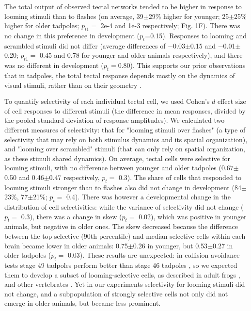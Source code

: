 \documentclass{article}
\begin{document}
The total output of observed tectal networks tended to be higher in response to looming stimuli than to flashes (on average, 39$\pm$29\% higher for younger; 25$\pm$25\% higher for older tadpoles; $p_{t1}=$ 2e-4 and 1e-3 respectively; Fig. 1F). There was no change in this preference in development ($p_t$=0.15). Responses to looming and scrambled stimuli did not differ (average differences of $-$0.03$\pm$0.15 and $-$0.01$\pm$0.20; $p_{t1}=$ 0.45 and 0.78 for younger and older animals respectively), and there was no different in development ($p_t=$0.80). This supports our prior observations that in tadpoles, the total tectal response depends mostly on the dynamics of visual stimuli, rather than on their geometry \citep{khakhalin2014,jang2016}.

To quantify selectivity of each individual tectal cell, we used Cohen’s $d$ effect size of cell  responses to different stimuli (the difference in mean responses, divided by the pooled standard deviation of response amplitudes). We calculated two different measures of selectivity: that for "looming stimuli over flashes" (a type of selectivity that may rely on both stimulus dynamics and its spatial organization), and "looming over scrambled" stimuli (that can only rely on spatial organization, as these stimuli shared dynamics). On average, tectal cells were selective for looming stimuli, with no difference between younger and older tadpoles (0.67$\pm$0.50 and 0.46$\pm$0.47 respectively, $p_t=$ 0.3). The share of cells that responded to looming stimuli stronger than to flashes also did not change in development (84$\pm$23\%, 77$\pm$21\%; $p_t=$ 0.4). There was however a developmental change in the distribution of cell selectivities: while the variance of selectivity did not change ($p_t=$ 0.3), there was a change in skew ($p_t=$ 0.02), which was positive in younger animals, but negative in older ones. The skew decreased because the difference between the top-selective (90th percentile) and median selective cells within each brain became lower in older animals: 0.75$\pm$0.26 in younger, but 0.53$\pm$0.27 in older tadpoles ($p_t=$ 0.03). These results are unexpected: in collision avoidance tests stage 49 tadpoles perform better than stage 46 tadpoles \citep{dong2009}, so we expected them to develop a subset of looming-selective cells, as described in adult frogs \citep{nakagawa2010otneurons,baranauskas2012}, and other vertebrates \citep{wang1992pigeon,wu2005pigeon,liu2011cat}. Yet in our experiments selectivity for looming stimuli did not change, and a subpopulation of strongly selective cells not only did not emerge in older animals, but became less prominent.
\end{document}

